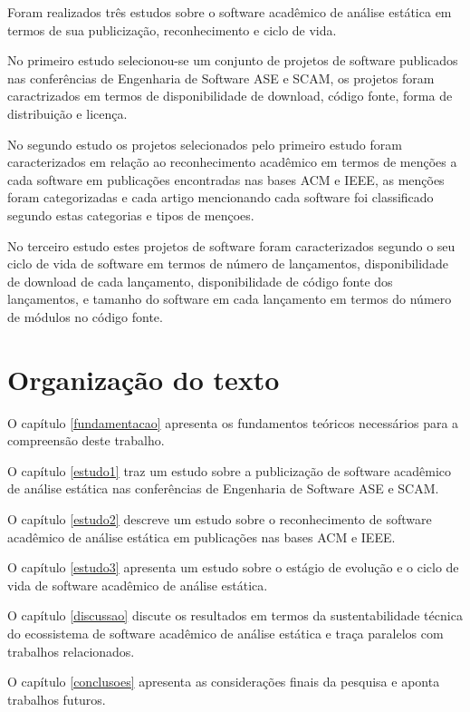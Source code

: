Foram realizados três estudos sobre o software acadêmico de análise estática em
termos de sua publicização, reconhecimento e ciclo de vida.

No primeiro estudo selecionou-se um conjunto de projetos de software publicados
nas conferências de Engenharia de Software ASE e SCAM, os projetos foram
caractrizados em termos de disponibilidade de download, código fonte, forma de
distribuição e licença.

No segundo estudo os projetos selecionados pelo primeiro estudo foram
caracterizados em relação ao reconhecimento acadêmico em termos de menções a
cada software em publicações encontradas nas bases ACM e IEEE, as menções foram
categorizadas e cada artigo mencionando cada software foi classificado segundo
estas categorias e tipos de mençoes.

No terceiro estudo estes projetos de software foram caracterizados segundo o
seu ciclo de vida de software em termos de número de lançamentos,
disponibilidade de download de cada lançamento, disponibilidade de código fonte
dos lançamentos, e tamanho do software em cada lançamento em termos do número
de módulos no código fonte.

\section{Organização do texto}

O capítulo \ref{fundamentacao} apresenta os fundamentos teóricos necessários
para a compreensão deste trabalho.

O capítulo \ref{estudo1} traz um estudo sobre a publicização de software
acadêmico de análise estática nas conferências de Engenharia de Software ASE e
SCAM.

O capítulo \ref{estudo2} descreve um estudo sobre o reconhecimento de software
acadêmico de análise estática em publicações nas bases ACM e IEEE.

O capítulo \ref{estudo3} apresenta um estudo sobre o estágio de evolução e o
ciclo de vida de software acadêmico de análise estática.

O capítulo \ref{discussao} discute os resultados em termos da sustentabilidade
técnica do ecossistema de software acadêmico de análise estática e traça
paralelos com trabalhos relacionados.

O capítulo \ref{conclusoes} apresenta as considerações finais da pesquisa e
aponta trabalhos futuros.


